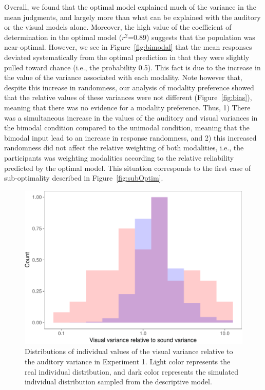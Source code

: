 \documentclass[english,floatsintext,man]{apa6}
\theoremstyle{definition}
\theoremstyle{definition}
\theoremstyle{definition}
\theoremstyle{remark}
\begin{document}
Overall, we found that the optimal model explained much of the variance
in the mean judgments, and largely more than what can be explained with
the auditory or the visual models alone. Moreover, the high value of the
coefficient of determination in the optimal model (\(r^2\)=0.89)
suggests that the population was near-optimal. However, we see in
Figure~\ref{fig:bimodal} that the mean responses deviated systematically
from the optimal prediction in that they were slightly pulled toward
chance (i.e., the probability 0.5). This fact is due to the increase in
the value of the variance associated with each modality. Note however
that, despite this increase in randomness, our analysis of modality
preference showed that the relative values of these variances were not
different (Figure~\ref{fig:bias}), meaning that there was no evidence
for a modality preference. Thus, 1) There was a simultaneous increase in
the values of the auditory and visual variances in the bimodal condition
compared to the unimodal condition, meaning that the bimodal input lead
to an increase in response randomness, and 2) this increased randomness
did not affect the relative weighting of both modalities, i.e., the
participants was weighting modalities according to the relative
reliability predicted by the optimal model. This situation corresponds
to the first case of sub-optimality described in
Figure~\ref{fig:subOptim}.

\begin{figure}[!h]
\includegraphics[width=\textwidth]{ms_files/figure-latex/individual-1} \caption{Distributions of individual values of the visual variance relative to the auditory variance in Experiment 1. Light color represents the real individual distribution, and dark color represents the simulated individual distribution sampled from the descriptive model.}\label{fig:individual}
\end{figure}
\end{document}
